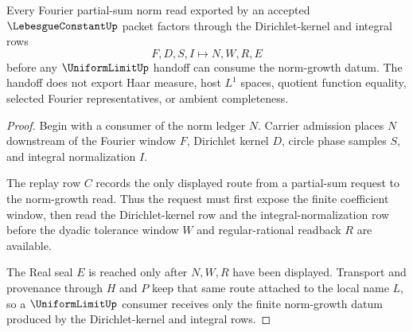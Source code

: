 \begin{theorem}
\label{thm:lebesgue-constant-dirichlet-norm-handoff}
Every Fourier partial-sum norm read exported by an accepted $\LebesgueConstantUp$ packet factors through the Dirichlet-kernel and integral rows
$$
F,D,S,I \longmapsto N,W,R,E
$$
before any $\UniformLimitUp$ handoff can consume the norm-growth datum. The handoff does not export Haar measure, host $L^{1}$ spaces, quotient function equality, selected Fourier representatives, or ambient completeness.
\end{theorem}
\begin{proof}
Begin with a consumer of the norm ledger $N$. Carrier admission places $N$ downstream of the Fourier window $F$, Dirichlet kernel $D$, circle phase samples $S$, and integral normalization $I$.

The replay row $C$ records the only displayed route from a partial-sum request to the norm-growth read. Thus the request must first expose the finite coefficient window, then read the Dirichlet-kernel row and the integral-normalization row before the dyadic tolerance window $W$ and regular-rational readback $R$ are available.

The Real seal $E$ is reached only after $N,W,R$ have been displayed. Transport and provenance through $H$ and $P$ keep that same route attached to the local name $L$, so a $\UniformLimitUp$ consumer receives only the finite norm-growth datum produced by the Dirichlet-kernel and integral rows.
\end{proof}


\begin{closurestatus}{\LebesgueConstantUp}
  \theoryclosure{\seedClosure}
  \formalstatus{\formalTargetV}
\end{closurestatus}
